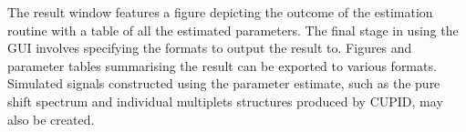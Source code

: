 The result window features a figure depicting the outcome of the
estimation routine with a table of all the estimated parameters.
The final stage in using the \ac{GUI} involves specifying the formats to output
the result to. Figures and parameter tables summarising the result can be
exported to various formats. Simulated signals constructed using the
parameter estimate, such as the pure shift spectrum and individual multiplets
structures produced by \ac{CUPID}, may also be created.

